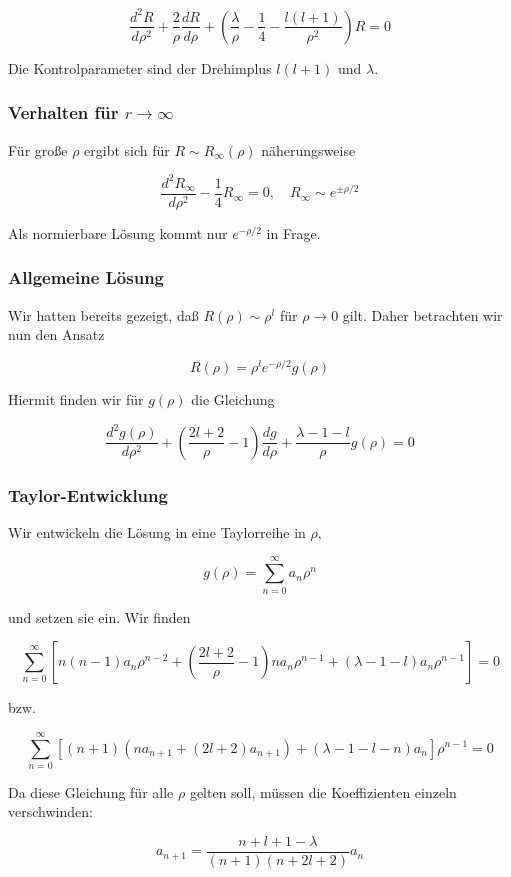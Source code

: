 \documentclass[10pt, letterpaper]{article}
\begin{document}
$$
\frac{d^{2} R}{d \rho^{2}}+\frac{2}{\rho} \frac{d R}{d \rho}+\left(\frac{\lambda}{\rho}-\frac{1}{4}-\frac{l(l+1)}{\rho^{2}}\right) R=0
$$

Die Kontrolparameter sind der Drehimplus $l(l+1)$ und $\lambda$.

\subsubsection*{Verhalten für $r \rightarrow \infty$}
Für große $\rho$ ergibt sich für $R \sim R_{\infty}(\rho)$ näherungsweise

$$
\frac{d^{2} R_{\infty}}{d \rho^{2}}-\frac{1}{4} R_{\infty}=0, \quad R_{\infty} \sim e^{ \pm \rho / 2}
$$

Als normierbare Lösung kommt nur $e^{-\rho / 2}$ in Frage.

\subsubsection*{Allgemeine Lösung}
Wir hatten bereits gezeigt, daß $R(\rho) \sim \rho^{l}$ für $\rho \rightarrow 0$ gilt. Daher betrachten wir nun den Ansatz

$$
R(\rho)=\rho^{l} e^{-\rho / 2} g(\rho)
$$

Hiermit finden wir für $g(\rho)$ die Gleichung

$$
\frac{d^{2} g(\rho)}{d \rho^{2}}+\left(\frac{2 l+2}{\rho}-1\right) \frac{d g}{d \rho}+\frac{\lambda-1-l}{\rho} g(\rho)=0
$$

\subsubsection*{Taylor-Entwicklung}
Wir entwickeln die Lösung in eine Taylorreihe in $\rho$,

$$
g(\rho)=\sum_{n=0}^{\infty} a_{n} \rho^{n}
$$

und setzen sie ein. Wir finden

$$
\sum_{n=0}^{\infty}\left[n(n-1) a_{n} \rho^{n-2}+\left(\frac{2 l+2}{\rho}-1\right) n a_{n} \rho^{n-1}+(\lambda-1-l) a_{n} \rho^{n-1}\right]=0
$$

bzw.

$$
\sum_{n=0}^{\infty}\left[(n+1)\left(n a_{n+1}+(2 l+2) a_{n+1}\right)+(\lambda-1-l-n) a_{n}\right] \rho^{n-1}=0
$$

Da diese Gleichung für alle $\rho$ gelten soll, müssen die Koeffizienten einzeln verschwinden:

$$
a_{n+1}=\frac{n+l+1-\lambda}{(n+1)(n+2 l+2)} a_{n}
$$
\end{document}
